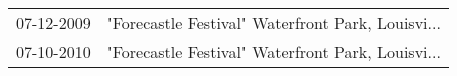 \begin{supertabular}{ll}
 07-12-2009 &  "Forecastle Festival" Waterfront Park, Louisvi... \\
 07-10-2010 &  "Forecastle Festival" Waterfront Park, Louisvi... \\
\end{supertabular}
